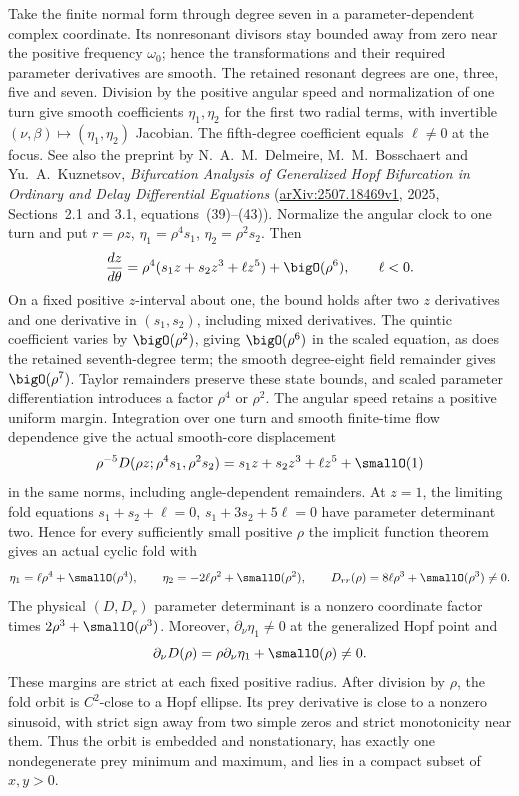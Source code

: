Take the finite normal form through degree
seven in a parameter-dependent complex coordinate. Its nonresonant
divisors stay bounded away from zero near the positive frequency
\(\omega_0\); hence the transformations and their required parameter
derivatives are smooth. The retained resonant degrees are one,
three, five and seven. Division by the positive angular speed and
normalization of one turn give smooth coefficients \(\eta_1,\eta_2\)
for the first two radial terms, with invertible
\((\nu,\beta)\mapsto(\eta_1,\eta_2)\) Jacobian. The fifth-degree
coefficient equals \(\ell\ne0\) at the focus. See also the preprint by
N.~A.~M.~Delmeire, M.~M.~Bosschaert and Yu.~A.~Kuznetsov,
\emph{Bifurcation Analysis of Generalized Hopf Bifurcation in Ordinary and
Delay Differential Equations}
(\href{https://arxiv.org/abs/2507.18469v1}{arXiv:2507.18469v1},
2025, Sections~2.1 and 3.1, equations~(39)--(43)).
Normalize the angular clock to one turn and put
\(r=\rho z\), \(\eta_1=\rho^4s_1\), \(\eta_2=\rho^2s_2\).
Then
\begin{equation}\label{eq:harvesting:weighted-flow}
 \frac{dz}{d\theta}
 =\rho^4(s_1z+s_2z^3+\ell z^5)+\bigO(\rho^6),\qquad \ell<0.
\end{equation}
On a fixed positive \(z\)-interval about one, the bound holds after
two \(z\) derivatives and one derivative in \((s_1,s_2)\), including
mixed derivatives. The quintic coefficient varies by \(\bigO(\rho^2)\),
giving \(\bigO(\rho^6)\) in the scaled equation, as does the retained
seventh-degree term; the smooth degree-eight field remainder gives
\(\bigO(\rho^7)\). Taylor remainders preserve these state bounds,
and scaled parameter differentiation introduces a factor \(\rho^4\)
or \(\rho^2\). The angular speed retains a positive uniform margin.
Integration over one turn and smooth finite-time flow dependence give
the actual smooth-core displacement
\begin{equation}\label{eq:harvesting:scaled-return}
 \rho^{-5}D(\rho z;\rho^4s_1,\rho^2s_2)
 =s_1z+s_2z^3+\ell z^5+\smallO(1)
\end{equation}
in the same norms, including angle-dependent remainders.
At \(z=1\), the limiting fold equations
\(s_1+s_2+\ell=0\), \(s_1+3s_2+5\ell=0\) have parameter
determinant two. Hence for every sufficiently small positive \(\rho\)
the implicit function theorem gives an actual cyclic fold with
\begin{equation}\label{eq:harvesting:fold-data}
 \eta_1=\ell\rho^4+\smallO(\rho^4),\qquad
 \eta_2=-2\ell\rho^2+\smallO(\rho^2),\qquad
 D_{rr}(\rho)=8\ell\rho^3+\smallO(\rho^3)\ne0.
\end{equation}
The physical \((D,D_r)\) parameter determinant is a nonzero
coordinate factor times \(2\rho^3+\smallO(\rho^3)\). Moreover,
\(\partial_\nu\eta_1\ne0\) at the generalized Hopf point and
\[
 \partial_\nu D(\rho)
 =\rho\partial_\nu\eta_1+\smallO(\rho)\ne0.
\]
These margins are strict at each fixed positive radius.
After division by \(\rho\), the fold orbit is \(C^2\)-close to a
Hopf ellipse. Its prey derivative is close to a nonzero sinusoid,
with strict sign away from two simple zeros and strict monotonicity
near them. Thus the orbit is embedded and nonstationary, has exactly
one nondegenerate prey minimum and maximum, and lies in a compact
subset of \(x,y>0\).
